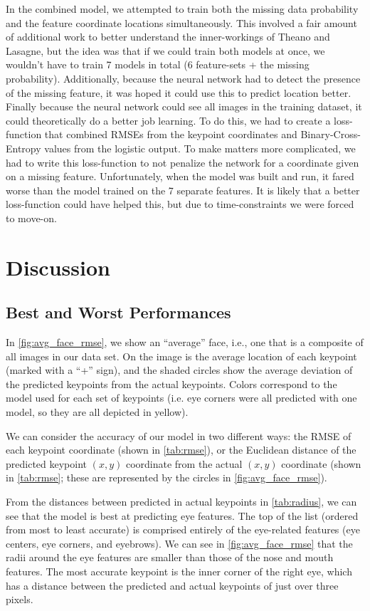 \documentclass[journal]{IEEEtran}
\begin{document}
In the combined model, we attempted to train both the missing data probability and the feature coordinate locations simultaneously.  This involved a fair amount of additional work to better understand the inner-workings of Theano and Lasagne, but the idea was that if we could train both models at once, we wouldn't have to train 7 models in total (6 feature-sets + the missing probability).  Additionally, because the neural network had to detect the presence of the missing feature, it was hoped it could use this to predict location better. Finally because the neural network could see all images in the training dataset, it could theoretically do a better job learning.  To do this, we had to create a loss-function that combined RMSEs from the keypoint coordinates and Binary-Cross-Entropy values from the logistic output.  To make matters more complicated, we had to write this loss-function to not penalize the network for a coordinate given on a missing feature.  Unfortunately, when the model was built and run, it fared worse than the model trained on the 7 separate features. It is likely that a better loss-function could have helped this, but due to time-constraints we were forced to move-on.

\section{Discussion}

\subsection{Best and Worst Performances}

In \cref{fig:avg_face_rmse}, we show an ``average'' face, i.e., one that is a composite of all images in our data set. On the image is the average location of each keypoint (marked with a ``+'' sign), and the shaded circles show the average deviation of the predicted keypoints from the actual keypoints. Colors correspond to the model used for each set of keypoints (i.e. eye corners were all predicted with one model, so they are all depicted in yellow).

We can consider the accuracy of our model in two different ways: the RMSE of each keypoint coordinate (shown in \cref{tab:rmse}), or the Euclidean distance of the predicted keypoint $(x,y)$ coordinate from the actual $(x,y)$ coordinate (shown in \cref{tab:rmse}; these are represented by the circles in \cref{fig:avg_face_rmse}). 

From the distances between predicted in actual keypoints in \cref{tab:radius}, we can see that the model is best at predicting eye features. The top of the list (ordered from most to least accurate) is comprised entirely of the eye-related features (eye centers, eye corners, and eyebrows). We can see in \cref{fig:avg_face_rmse} that the radii around the eye features are smaller than those of the nose and mouth features. The most accurate keypoint is the inner corner of the right eye, which has a distance between the predicted and actual keypoints of just over three pixels.
\end{document}
